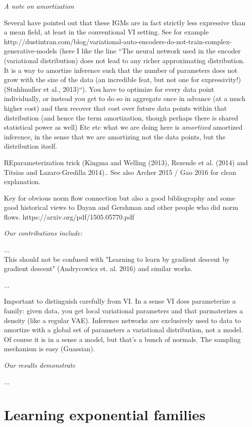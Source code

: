 \documentclass{article}
\begin{document}
 \emph{A note on amortization}
 
 Several have pointed out that these IGMs are in fact strictly less expressive than a mean field, at least in the conventional VI setting.  See for example http://dustintran.com/blog/variational-auto-encoders-do-not-train-complex-generative-models  (here I like the line ``The neural network used in the encoder (variational distribution) does not lead to any richer approximating distribution. It is a way to amortize inference such that the number of parameters does not grow with the size of the data (an incredible feat, but not one for expressivity!) (Stuhlmuller et al., 2013)``).
 You have to optimize for every data point individually, or instead you get to do so in aggregate once in advance (at a much higher cost) and then recover that cost over future data points within that distribution (and hence the term amortization, though perhaps there is shared statistical power as well)
 Etc etc what we are doing here is \emph{amortized} amortized inference, in the sense that we are amortizing not the data points, but the distribution itself.
 
REparameterization trick (Kingma and Welling (2013), Rezende et al. (2014) and Titsias and Lazaro-Gredilla 2014)..  See also Archer 2015 / Gao 2016 for clean explanation.  
 
 Key for obvious norm flow connection but also a good bibliography and some good historical views to Dayan and Gershman and other people who did norm flows.  https://arxiv.org/pdf/1505.05770.pdf
 
\emph{Our contributions include:}


... \\
This should not be confused with "Learning to learn by gradient descent by gradient descent" (Andrycowicz et. al. 2016) and similar works.

...

Important to distinguish carefully from VI.  In a sense VI does parameterize a family: given data, you get local variational parameters and that parmaterizes a density (like a regular VAE).  Inference networks are exclusively used to data to amortize with a global set of parameters a variational distribution, not a model.  Of course it is in a sense a model, but that's a bunch of normals.  The sampling mechanism is easy (Guassian).  

\emph{Our results demonstrate}

...

  
 \section{Learning exponential families}
 
\end{document}

